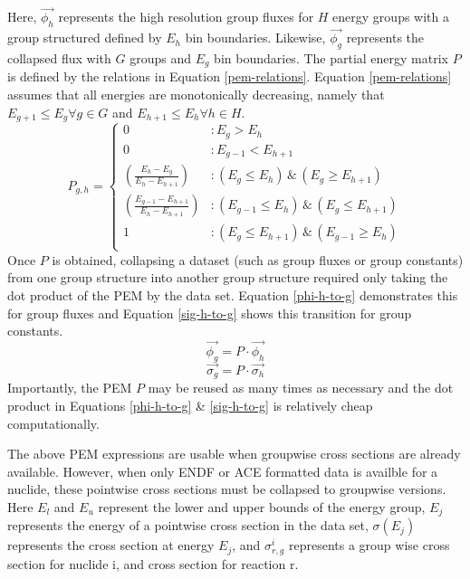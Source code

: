 \documentclass{article}
\begin{document}
Here, $\vec{\phi_h}$ represents the high resolution group fluxes for $H$ energy groups with
a group structured defined by $E_h$ bin boundaries. Likewise, $\vec{\phi_g}$ represents
the collapsed flux with $G$ groups and $E_g$ bin boundaries. The partial energy
matrix $P$ is defined by the relations in Equation \ref{pem-relations}.
Equation \ref{pem-relations} assumes that all energies are monotonically decreasing, namely
that $E_{g+1} \le E_{g} \forall g\in G$ and $E_{h+1} \le E_{h} \forall h\in H$.
\begin{equation}
\label{pem-relations}
P_{g,h} = \left\{
\begin{array}{ll}
    0 & : E_{g} > E_{h} \\
    0 & : E_{g-1} < E_{h+1} \\
    \left(\frac{E_h - E_g}{E_h - E_{h+1}}\right) & : (E_{g} \le E_h) \, \& \, (E_{g} \ge E_{h+1}) \\
    \left(\frac{E_{g-1} - E_{h+1}}{E_h - E_{h+1}}\right) & : (E_{g-1} \le E_h) \, \& \, (E_{g} \le E_{h+1}) \\
    1 & : (E_{g} \le E_{h+1}) \, \& \, (E_{g-1} \ge E_{h}) \\
\end{array}
\right.
\end{equation}
Once $P$ is obtained, collapsing a dataset (such as group fluxes or group constants) from one
group structure into another group structure required only taking the dot product of the PEM
by the data set. Equation \ref{phi-h-to-g} demonstrates this for group fluxes and Equation
\ref{sig-h-to-g} shows this transition for group constants.
\begin{equation}
\label{phi-h-to-g}
\vec{\phi_g} = P \cdot \vec{\phi_h}
\end{equation}
\begin{equation}
\label{sig-h-to-g}
\vec{\sigma_g} = P \cdot \vec{\sigma_h}
\end{equation}
Importantly, the PEM $P$ may be reused as many times as necessary and the dot product in
Equations \ref{phi-h-to-g} \& \ref{sig-h-to-g} is relatively cheap computationally.


The above PEM expressions are usable when groupwise cross sections are already available.
However, when only ENDF or ACE formatted data is availble for a nuclide, these pointwise
cross sections must be collapsed to groupwise versions.
Here $E_l$ and $E_u$ represent the lower and upper bounds of the energy group, $E_j$ represents the energy of a pointwise cross section in the data set, $\sigma(E_j)$ represents the cross section at energy $E_j$, and $\sigma_{r,g}^i$ represents a group wise cross section for nuclide i, and cross section for reaction r.
\end{document}
